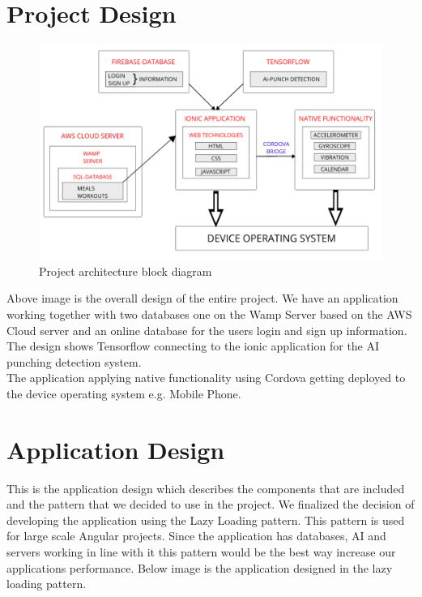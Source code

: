 \documentclass[a4paper,12pt]{report}
\begin{document}
\section{Project Design}
\begin{figure}[h]
\includegraphics[scale=.37]{images/projectOverview.png}
\caption{Project architecture block diagram}
\label{fig:projectDiagram}
\end{figure}

Above image is the overall design of the entire project. We have an application working together with two databases one on the Wamp Server based on the AWS Cloud server and an online database for the users login and sign up information.\\
The design shows Tensorflow connecting to the ionic application for the AI punching detection system.\\
The application applying native functionality using Cordova getting deployed to the device operating system e.g. Mobile Phone. 
\section{Application Design}
This is the application design which describes the components that are included and the pattern that we decided to use in the project.
We finalized the decision of developing the application using the Lazy Loading pattern. This pattern is used for large scale Angular projects.
Since the application has databases, AI and servers working in line with it this pattern would be the best way increase our applications performance.
Below image is the application designed in the lazy loading pattern.
\end{document}
